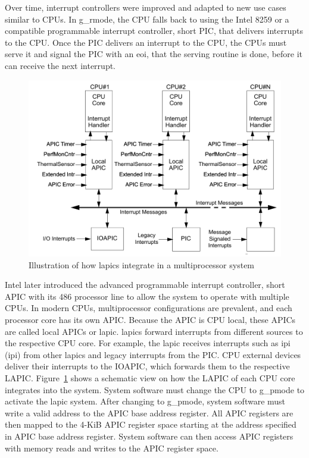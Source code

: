 Over time, interrupt controllers were improved and adapted to new use cases
similar to CPUs. In \gls{g_rmode}, the CPU falls back to using the Intel 8259 or a
compatible programmable interrupt controller, short PIC, that delivers
interrupts to the CPU. Once the PIC delivers an interrupt to the CPU, the CPUs
must serve it and signal the PIC with an \gls{eoi}, that
the serving routine is done, before it can receive the next interrupt. \\

\begin{figure}
    \begin{center}
        \includegraphics[width=.6\textwidth]{images/lapic_placeholder.png}
        \caption{Illustration of how \gls{lapic}s integrate in a
            multiprocessor system}
        \label{fig:state:technical:lapic}
    \end{center}
\end{figure}

Intel later introduced the advanced programmable interrupt controller, short
APIC with its 486 processor line to allow the system to operate with multiple
CPUs. In modern CPUs, multiprocessor configurations are prevalent, and each
processor core has its own APIC. Because the APIC is CPU local, these APICs are
called local APICs or \gls{lapic}. \gls{lapic}s
forward interrupts from different sources to the respective CPU core. For
example, the \gls{lapic} receives interrupts such as \gls{ipi}
(\gls{ipi}) from other \gls{lapic}s and legacy interrupts from the
PIC. CPU external devices deliver their interrupts to the IOAPIC, which
forwards them to the respective LAPIC. Figure~\ref{fig:state:technical:lapic}
shows a schematic view on how the LAPIC of each CPU core integrates into the
system. System software must change the CPU to \gls{g_pmode} to activate the
\gls{lapic} system. After changing to \gls{g_pmode}, system software must
write a valid address to the APIC base address register. All APIC registers are
then mapped to the 4-KiB APIC register space starting at the address specified
in APIC base address register. System software can then access APIC registers
with memory reads and writes to the APIC register space.

